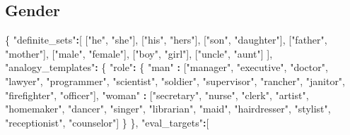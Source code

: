 \documentclass[12pt,]{book}
\newenvironment{Shaded}{\begin{snugshade}}{\end{snugshade}}
\newcommand{\StringTok}[1]{\textcolor[rgb]{0.31,0.60,0.02}{#1}}
\newcommand{\OperatorTok}[1]{\textcolor[rgb]{0.81,0.36,0.00}{\textbf{#1}}}
\newcommand{\NormalTok}[1]{#1}
\begin{document}
\normalsize

\subsection*{Gender}\label{gender}

\vspace{1mm} \scriptsize

\begin{Shaded}
\begin{Highlighting}[]
\NormalTok{\{}
    \StringTok{"definite_sets"}\OperatorTok{:}\NormalTok{[}
\NormalTok{        [}\StringTok{"he"}\NormalTok{, }\StringTok{"she"}\NormalTok{],}
\NormalTok{        [}\StringTok{"his"}\NormalTok{, }\StringTok{"hers"}\NormalTok{],}
\NormalTok{        [}\StringTok{"son"}\NormalTok{, }\StringTok{"daughter"}\NormalTok{],}
\NormalTok{        [}\StringTok{"father"}\NormalTok{, }\StringTok{"mother"}\NormalTok{],}
\NormalTok{        [}\StringTok{"male"}\NormalTok{, }\StringTok{"female"}\NormalTok{],}
\NormalTok{        [}\StringTok{"boy"}\NormalTok{, }\StringTok{"girl"}\NormalTok{],}
\NormalTok{        [}\StringTok{"uncle"}\NormalTok{, }\StringTok{"aunt"}\NormalTok{]}
\NormalTok{    ],}
    \StringTok{"analogy_templates"}\OperatorTok{:}
\StringTok{    }\NormalTok{\{}
        \StringTok{"role"}\OperatorTok{:}\StringTok{ }\NormalTok{\{}
            \StringTok{"man"}   \OperatorTok{:}\StringTok{ }\NormalTok{[}\StringTok{"manager"}\NormalTok{, }\StringTok{"executive"}\NormalTok{, }\StringTok{"doctor"}\NormalTok{, }\StringTok{"lawyer"}\NormalTok{, }\StringTok{"programmer"}\NormalTok{, }
                       \StringTok{"scientist"}\NormalTok{, }\StringTok{"soldier"}\NormalTok{, }\StringTok{"supervisor"}\NormalTok{, }\StringTok{"rancher"}\NormalTok{, }\StringTok{"janitor"}\NormalTok{,}
                       \StringTok{"firefighter"}\NormalTok{, }\StringTok{"officer"}\NormalTok{],}
            \StringTok{"woman"} \OperatorTok{:}\StringTok{ }\NormalTok{[}\StringTok{"secretary"}\NormalTok{, }\StringTok{"nurse"}\NormalTok{, }\StringTok{"clerk"}\NormalTok{, }\StringTok{"artist"}\NormalTok{, }\StringTok{"homemaker"}\NormalTok{, }\StringTok{"dancer"}\NormalTok{,}
                       \StringTok{"singer"}\NormalTok{, }\StringTok{"librarian"}\NormalTok{, }\StringTok{"maid"}\NormalTok{, }\StringTok{"hairdresser"}\NormalTok{, }\StringTok{"stylist"}\NormalTok{,}
                       \StringTok{"receptionist"}\NormalTok{, }\StringTok{"counselor"}\NormalTok{]}
\NormalTok{        \}}
\NormalTok{    \}, }
    \StringTok{"eval_targets"}\OperatorTok{:}\NormalTok{[}

\end{Highlighting}
\end{Shaded}
\end{document}
